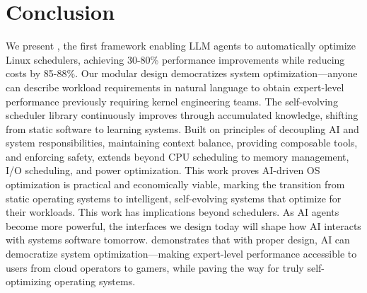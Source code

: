\section{Conclusion}
\label{sec:conclusion}

We present \sys, the first framework enabling LLM agents to automatically optimize Linux schedulers, achieving 30-80\% performance improvements while reducing costs by 85-88\%. Our modular design democratizes system optimization—anyone can describe workload requirements in natural language to obtain expert-level performance previously requiring kernel engineering teams. The self-evolving scheduler library continuously improves through accumulated knowledge, shifting from static software to learning systems. Built on principles of decoupling AI and system responsibilities, maintaining context balance, providing composable tools, and enforcing safety, \sys extends beyond CPU scheduling to memory management, I/O scheduling, and power optimization. This work proves AI-driven OS optimization is practical and economically viable, marking the transition from static operating systems to intelligent, self-evolving systems that optimize for their workloads. This work has implications beyond schedulers. As AI agents become more powerful, the interfaces we design today will shape how AI interacts with systems software tomorrow. \sys demonstrates that with proper design, AI can democratize system optimization—making expert-level performance accessible to users from cloud operators to gamers, while paving the way for truly self-optimizing operating systems.